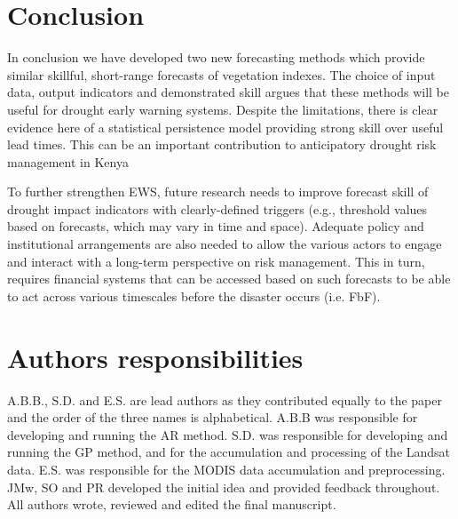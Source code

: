 \documentclass[review]{elsarticle}
\begin{document}

\section{Conclusion}

In conclusion we have developed two new forecasting methods which provide similar skillful, short-range forecasts of vegetation indexes. The choice of input data, output indicators and demonstrated skill argues that these methods will be useful for drought early warning systems. Despite the limitations, there is clear evidence here of a statistical persistence model providing strong skill over useful lead times. This can be an important contribution to anticipatory drought risk management in Kenya

To further strengthen EWS, future research needs to improve forecast skill of drought impact indicators with clearly-defined triggers (e.g., threshold values based on forecasts, which may vary in time and space). Adequate policy and institutional arrangements are also needed to allow the various actors to engage and interact with a long-term perspective on risk management. This in turn, requires financial systems that can be accessed based on such forecasts to be able to act across various timescales before the disaster occurs (i.e. FbF).



\section*{Authors responsibilities}
A.B.B., S.D. and E.S. are lead authors as they contributed equally to the paper and the order of the three names is alphabetical. A.B.B was responsible for developing and running the AR method. S.D. was responsible for developing and running the GP method, and for the accumulation and processing of the Landsat data. E.S. was responsible for the MODIS data accumulation and preprocessing. JMw, SO and PR developed the initial idea and provided feedback throughout. All authors wrote, reviewed and edited the final manuscript. 
\end{document}
